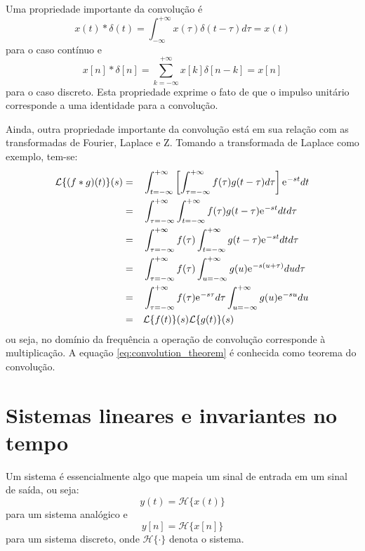 \documentclass[12pt,a4paper]{report}
\newcommand{\euler}{{\mathrm{e}\mkern1mu}}
\begin{document}
  Uma propriedade importante da convolução é
  \begin{equation}
    \label{eq:continuous_convolution_identity}
    x(t) \ast \delta(t) = \int_{-\infty}^{+\infty} x(\tau) \delta(t - \tau) d\tau = x(t)
  \end{equation}
  para o caso contínuo e
  \begin{equation}
    \label{eq:discrete_convolution_identity}
    x[n] \ast \delta[n] = \sum_{k = -\infty}^{+\infty} x[k] \delta[n - k] = x[n]
  \end{equation}
  para o caso discreto. Esta propriedade exprime o fato de que o impulso unitário corresponde a uma identidade
  para a convolução.

  Ainda, outra propriedade importante da convolução está em sua relação com as transformadas de Fourier, Laplace
  e Z. Tomando a transformada de Laplace como exemplo, tem-se:
  \begin{equation}
    \label{eq:convolution_theorem}
    \begin{split}
      \mathcal{L}\{(f \ast g)(t)\}(s) = &\quad \int_{t = -\infty}^{+\infty} \left[\int_{\tau = -\infty}^{+\infty}
      f(\tau) g(t - \tau) d\tau\right] \euler^{-s t} dt
      \\ = &\quad \int_{\tau = -\infty}^{+\infty} \int_{t = -\infty}^{+\infty}
      f(\tau) g(t - \tau) \euler^{-s t} dt d\tau
      \\ = &\quad \int_{\tau = -\infty}^{+\infty} f(\tau) \int_{t = -\infty}^{+\infty}
      g(t - \tau) \euler^{-s t} dt d\tau
      \\ = &\quad \int_{\tau = -\infty}^{+\infty} f(\tau) \int_{u = -\infty}^{+\infty}
      g(u) \euler^{-s(u+\tau)} du d\tau
      \\ = &\quad \int_{\tau = -\infty}^{+\infty} f(\tau) \euler^{-s \tau} d\tau
      \int_{u = -\infty}^{+\infty} g(u) \euler^{-s u} du
      \\ = &\quad \mathcal{L}\{f(t)\}(s) \mathcal{L}\{g(t)\}(s)
    \end{split}
  \end{equation}
  ou seja, no domínio da frequência a operação de convolução corresponde à multiplicação. A equação
  \ref{eq:convolution_theorem} é conhecida como teorema do convolução.

\section{Sistemas lineares e invariantes no tempo}
  Um sistema é essencialmente algo que mapeia um sinal de entrada em um sinal de saída, ou seja:
  \begin{equation}
    y(t) = \mathcal{H}\{x(t)\}
  \end{equation}
  para um sistema analógico e
  \begin{equation}
    y[n] = \mathcal{H}\{x[n]\}
  \end{equation}
  para um sistema discreto, onde $\mathcal{H}\{\cdot\}$ denota o sistema.
\end{document}
